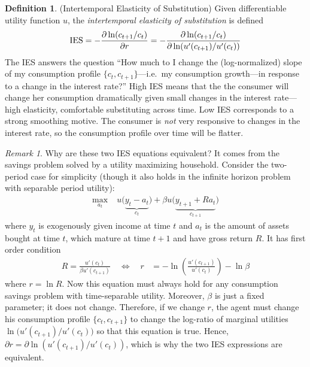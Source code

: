 \documentclass[12pt]{article}
\theoremstyle{plain}
\theoremstyle{definition}
\newtheorem{defn}[thm]{Definition}
\theoremstyle{remark}
\newtheorem*{rmk}{Remark}
\begin{document}
\begin{defn}(Intertemporal Elasticity of Substitution)
Given differentiable utility function $u$,
the \emph{intertemporal elasticity of substitution} is defined
\begin{align*}
  \text{IES}
  = -\frac{\partial \ln(c_{t+1}/c_t)}{\partial r}
  = -\frac{\partial \ln(c_{t+1}/c_t)}{%
    \partial \ln(u'(c_{t+1})/u'(c_t))}
\end{align*}
The IES answers the question ``How much to I change the (log-normalized)
slope of my consumption profile $\{c_t,c_{t+1}\}$---i.e.\ my consumption
growth---in response to a change in the interest rate?''
High IES means that the the consumer will change her consumption
dramatically given small changes in the interest rate---high elasticity,
comfortable substituting across time.
Low IES corresponds to a strong smoothing motive. The consumer is
\emph{not} very responsive to changes in the interest rate, so the
consumption profile over time will be flatter.
\end{defn}
\begin{rmk}
Why are these two IES equations equivalent?
It comes from the savings problem solved by a utility maximizing
household. Consider the two-period case for simplicity (though it also
holds in the infinite horizon problem with separable period utility):
\begin{align*}
  \max_{a_t} \; &
  u\big(
  \underbrace{y_t-a_t}_{c_t}
  \big)
  + \beta
  u\big(
  \underbrace{y_{t+1}+Ra_t}_{c_{t+1}}
  \big)
\end{align*}
where $y_t$ is exogenously given income at time $t$ and $a_t$ is the amount
of assets bought at time $t$, which mature at time $t+1$ and have gross
return $R$. It has first order condition
\begin{align*}
  R = \frac{u'(c_t)}{\beta u'(c_{t+1})}
  \quad\iff\quad
  r &= -\ln \left(\frac{u'(c_{t+1})}{u'(c_t)}\right) -\ln\beta
\end{align*}
where $r=\ln R$. Now this equation must always hold for any consumption
savings problem with time-separable utility. Moreover, $\beta$ is just a
fixed parameter; it does not change. Therefore, if we change $r$, the
agent must change his consumption profile $\{c_t,c_{t+1}\}$ to change
the log-ratio of marginal utilities $\ln\big(u'(c_{t+1})/u'(c_t)\big)$
so that this equation is true. Hence,
$\partial r = \partial \ln(u'(c_{t+1})/u'(c_t))$, which is why the two
IES expressions are equivalent.
\end{rmk}
\end{document}
